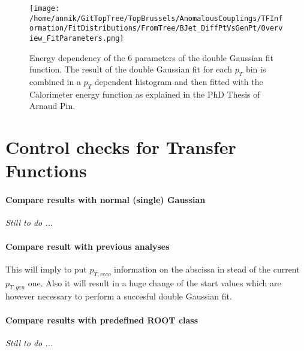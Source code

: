 \begin{figure}[!h]
  \centering
  \texttt{[image: /home/annik/GitTopTree/TopBrussels/AnomalousCouplings/TFInformation/FitDistributions/FromTree/BJet\_DiffPtVsGenPt/Overview\_FitParameters.png]}
  \caption{Energy dependency of the 6 parameters of the double Gaussian fit function. The result of the double Gaussian fit for each $p_T$ bin is combined in a $p_T$ dependent histogram and then fitted with the Calorimeter energy function as explained in the PhD Thesis of Arnaud Pin.} \label{fig::FitParamsBJetPt}
\end{figure}

\section{Control checks for Transfer Functions}

\paragraph{Compare results with normal (single) Gaussian\\}
\textit{Still to do ...}

\paragraph{Compare result with previous analyses\\}
This will imply to put $p_{T,reco}$ information on the abscissa in stead of the current $p_{T,gen}$ one. Also it will result in a huge change of the start values which are however necessary to perform a succesful double Gaussian fit.

\paragraph{Compare results with predefined ROOT class\\}
\textit{Still to do ...}
